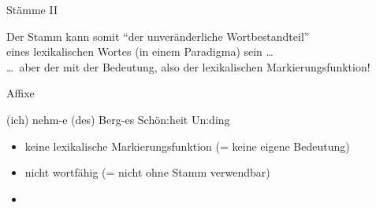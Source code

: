 \begin{frame}
  {Stämme II}
  \begin{exe}
    \ex
    \begin{xlist}
        \pause
        \pause
    \end{xlist}
  \end{exe}
  \pause
  \pause
  \pause
  \pause
  \pause
  Der \alert{Stamm} kann somit  "`der unveränderliche Wortbestandteil"'\\
  eines lexikalischen Wortes (in einem Paradigma) sein \ldots\\
  \Zeile
  \pause
  \alert{\dots\ aber der mit der Bedeutung, also der lexikalischen Markierungsfunktion}!
\end{frame}

\begin{frame}
  {Affixe}
  \pause
  \begin{exe}
    \ex
    \begin{xlist}
      \ex (ich) nehm\alert<6->{-e}
      \pause
      \ex (des) Berg\alert<7->{-es}
      \pause
      \ex Schön\alert<8->{:heit}
      \pause
      \ex \alert<9->{Un:}ding
    \end{xlist}
  \end{exe}
  \Zeile
  \pause
  \pause
  \pause
  \pause
  \pause
  \begin{itemize}[<+->]
    \item \alert{keine lexikalische Markierungsfunktion} (= keine eigene Bedeutung)
    \item \alert{nicht wortfähig} (= nicht ohne Stamm verwendbar)
      \Halbzeile
    \item {}
  \end{itemize}
\end{frame}




